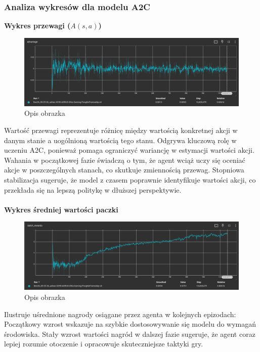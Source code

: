 \documentclass[a4paper, 12pt]{article}
\numberwithin{equation}{section}
\begin{document}
    \subsubsection{Analiza wykresów dla modelu A2C} 
    \noindent \textbf{Wykres przewagi (\( A(s,a) \))} 
    \begin{figure}[H]
        \centering
        \includegraphics[width=\textwidth]{pictures/A2C_advantage.png}
        \caption{Opis obrazka}
    \end{figure}
    Wartość przewagi reprezentuje różnicę między wartością konkretnej akcji w danym stanie a uogólnioną wartością tego stanu. Odgrywa kluczową rolę w uczeniu A2C, ponieważ pomaga ograniczyć wariancję w estymacji wartości akcji.
    Wahania w początkowej fazie świadczą o tym, że agent wciąż uczy się oceniać akcje w poszczególnych stanach, co skutkuje zmiennością przewag. Stopniowa stabilizacja sugeruje, że model z czasem poprawnie identyfikuje wartości akcji, co przekłada się na lepszą politykę w dłuższej perspektywie.
    \\ \\ 
    \textbf{Wykres średniej wartości paczki}
    \begin{figure}[H]
        \centering
        \includegraphics[width=\textwidth]{pictures/A2C_batch_rewards.png}
        \caption{Opis obrazka}
    \end{figure}
    Ilustruje uśrednione nagrody osiągane przez agenta w kolejnych epizodach:
    Początkowy wzrost wskazuje na szybkie dostosowywanie się modelu do wymagań środowiska. Stały wzrost wartości nagród w dalszej fazie sugeruje, że agent coraz lepiej rozumie otoczenie i opracowuje skuteczniejsze taktyki gry.
\end{document}
